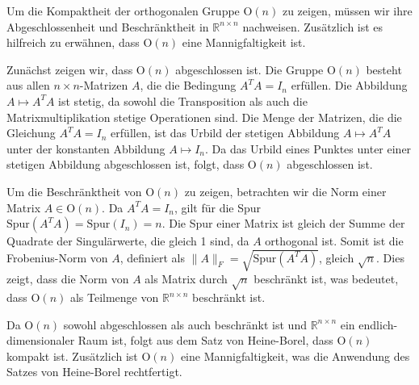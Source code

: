 Um die Kompaktheit der orthogonalen Gruppe $\mathrm{O}(n)$ zu zeigen, müssen wir ihre Abgeschlossenheit und Beschränktheit in $\mathbb{R}^{n \times n}$ nachweisen. Zusätzlich ist es hilfreich zu erwähnen, dass $\mathrm{O}(n)$ eine Mannigfaltigkeit ist.

Zunächst zeigen wir, dass $\mathrm{O}(n)$ abgeschlossen ist. Die Gruppe $\mathrm{O}(n)$ besteht aus allen $n \times n$-Matrizen $A$, die die Bedingung $A^T A = I_n$ erfüllen. Die Abbildung $A \mapsto A^T A$ ist stetig, da sowohl die Transposition als auch die Matrixmultiplikation stetige Operationen sind. Die Menge der Matrizen, die die Gleichung $A^T A = I_n$ erfüllen, ist das Urbild der stetigen Abbildung $A \mapsto A^T A$ unter der konstanten Abbildung $A \mapsto I_n$. Da das Urbild eines Punktes unter einer stetigen Abbildung abgeschlossen ist, folgt, dass $\mathrm{O}(n)$ abgeschlossen ist.

Um die Beschränktheit von $\mathrm{O}(n)$ zu zeigen, betrachten wir die Norm einer Matrix $A \in \mathrm{O}(n)$. Da $A^T A = I_n$, gilt für die Spur $\text{Spur}(A^T A) = \text{Spur}(I_n) = n$. Die Spur einer Matrix ist gleich der Summe der Quadrate der Singulärwerte, die gleich 1 sind, da $A$ orthogonal ist. Somit ist die Frobenius-Norm von $A$, definiert als $\|A\|_F = \sqrt{\text{Spur}(A^T A)}$, gleich $\sqrt{n}$. Dies zeigt, dass die Norm von $A$ als Matrix durch $\sqrt{n}$ beschränkt ist, was bedeutet, dass $\mathrm{O}(n)$ als Teilmenge von $\mathbb{R}^{n \times n}$ beschränkt ist.

Da $\mathrm{O}(n)$ sowohl abgeschlossen als auch beschränkt ist und $\mathbb{R}^{n \times n}$ ein endlich-dimensionaler Raum ist, folgt aus dem Satz von Heine-Borel, dass $\mathrm{O}(n)$ kompakt ist. Zusätzlich ist $\mathrm{O}(n)$ eine Mannigfaltigkeit, was die Anwendung des Satzes von Heine-Borel rechtfertigt.

